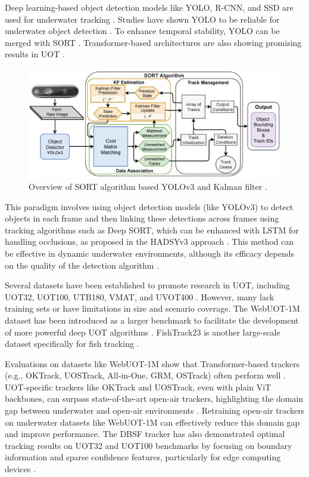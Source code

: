 Deep learning-based object detection models like YOLO, R-CNN, and SSD are used for underwater tracking \cite{lotfi2024comparison}\cite{elmezain2025advancing}. Studies have shown YOLO to be reliable for underwater object detection \cite{lotfi2024comparison}. To enhance temporal stability, YOLO can be merged with SORT \cite{lotfi2024comparison}. Transformer-based architectures are also showing promising results in UOT \cite{mathias2022occlusion}.
\begin{figure}[h]
    \centering
    \includegraphics[width=1\linewidth]{images/deepsort.png}
    \caption{Overview of SORT algorithm based YOLOv3 and Kalman filter \cite{pereira2022sort}.}
\end{figure}

This paradigm involves using object detection models (like YOLOv3) to detect objects in each frame and then linking these detections across frames using tracking algorithms such as Deep SORT, which can be enhanced with LSTM for handling occlusions, as proposed in the HADSYv3 approach \cite{mathias2022occlusion}\cite{elmezain2025advancing}. This method can be effective in dynamic underwater environments, although its efficacy depends on the quality of the detection algorithm \cite{mathias2022occlusion}.

Several datasets have been established to promote research in UOT, including UOT32, UOT100, UTB180, VMAT, and UVOT400 \cite{zhang2024webuot}\cite{qiu2024boundary}\cite{rout2019walsh}. However, many lack training sets or have limitations in size and scenario coverage. The WebUOT-1M dataset has been introduced as a larger benchmark to facilitate the development of more powerful deep UOT algorithms \cite{zhang2024webuot}. FishTrack23 is another large-scale dataset specifically for fish tracking \cite{elmezain2025advancing}.

Evaluations on datasets like WebUOT-1M show that Transformer-based trackers (e.g., OKTrack, UOSTrack, All-in-One, GRM, OSTrack) often perform well \cite{zhang2024webuot}. UOT-specific trackers like OKTrack and UOSTrack, even with plain ViT backbones, can surpass state-of-the-art open-air trackers, highlighting the domain gap between underwater and open-air environments \cite{zhang2024webuot}. Retraining open-air trackers on underwater datasets like WebUOT-1M can effectively reduce this domain gap and improve performance. The DBSF tracker has also demonstrated optimal tracking results on UOT32 and UOT100 benchmarks by focusing on boundary information and sparse confidence features, particularly for edge computing devices \cite{qiu2024boundary}.

